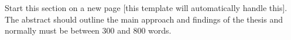 

%

%




\begin{instructional}
Start this section on a new page [this template will automatically handle this]. \\

\noindent
The abstract should outline the main approach and findings of the thesis and normally must be between 300 and 800 words.
\end{instructional}




%